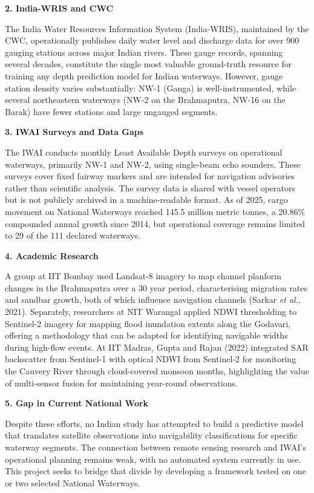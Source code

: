 \documentclass[12pt,a4paper]{article}
\begin{document}
\textbf{2. India-WRIS and CWC}

The India Water Resources Information System (India-WRIS), maintained by the CWC, operationally publishes daily water level and discharge data for over 900 gauging stations across major Indian rivers. These gauge records, spanning several decades, constitute the single most valuable ground-truth resource for training any depth prediction model for Indian waterways. However, gauge station density varies substantially: NW-1 (Ganga) is well-instrumented, while several northeastern waterways (NW-2 on the Brahmaputra, NW-16 on the Barak) have fewer stations and large ungauged segments.

\textbf{3. IWAI Surveys and Data Gaps}

The IWAI conducts monthly Least Available Depth surveys on operational waterways, primarily NW-1 and NW-2, using single-beam echo sounders. These surveys cover fixed fairway markers and are intended for navigation advisories rather than scientific analysis. The survey data is shared with vessel operators but is not publicly archived in a machine-readable format. As of 2025, cargo movement on National Waterways reached 145.5 million metric tonnes, a 20.86\% compounded annual growth since 2014, but operational coverage remains limited to 29 of the 111 declared waterways.

\textbf{4. Academic Research}

A group at IIT Bombay used Landsat-8 imagery to map channel planform changes in the Brahmaputra over a 30 year period, characterising migration rates and sandbar growth, both of which influence navigation channels (Sarkar \textit{et al.}, 2021). Separately, researchers at NIT Warangal applied NDWI thresholding to Sentinel-2 imagery for mapping flood inundation extents along the Godavari, offering a methodology that can be adapted for identifying navigable widths during high-flow events. At IIT Madras, Gupta and Rajan (2022) integrated SAR backscatter from Sentinel-1 with optical NDWI from Sentinel-2 for monitoring the Cauvery River through cloud-covered monsoon months, highlighting the value of multi-sensor fusion for maintaining year-round observations.

\textbf{5. Gap in Current National Work}

Despite these efforts, no Indian study has attempted to build a predictive model that translates satellite observations into navigability classifications for specific waterway segments. The connection between remote sensing research and IWAI's operational planning remains weak, with no automated system currently in use. This project seeks to bridge that divide by developing a framework tested on one or two selected National Waterways.
\end{document}
